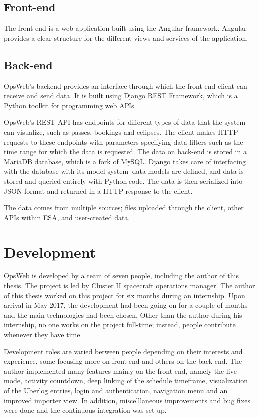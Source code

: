 \subsection{Front-end}
The front-end is a web application built using the Angular framework. \cite{angular} Angular provides a clear structure for the different views and services of the application.
\cite{d3js}
\subsection{Back-end}
OpsWeb's backend provides an interface through which the front-end client can receive and send data. It is built using Django REST Framework, which is a Python toolkit for programming web APIs. \cite{django} 

OpsWeb's REST API has endpoints for different types of data that the system can visualize, such as passes, bookings and eclipses. The client makes HTTP requests to these endpoints with parameters specifying data filters such as the time range for which the data is requested. The data on back-end is stored in a MariaDB database, which is a fork of MySQL. \cite{mariadb} Django takes care of interfacing with the database with its model system; data models are defined, and data is stored and queried entirely with Python code. The data is then serialized into JSON format and returned in a HTTP response to the client.

The data comes from multiple sources; files uploaded through the client, other APIs within ESA, and user-created data.

\section{Development}
OpsWeb is developed by a team of seven people, including the author of this thesis. The project is led by Cluster II spacecraft operations manager. The author of this thesis worked on this project for six months during an internship. Upon arrival in May 2017, the development had been going on for a couple of months and the main technologies had been chosen. Other than the author during his internship, no one works on the project full-time; instead, people contribute whenever they have time.

Development roles are varied between people depending on their interests and experience, some focusing more on front-end and others on the back-end. The author implemented many features mainly on the front-end, namely the live mode, activity countdown, deep linking of the schedule timeframe, visualization of the Uberlog entries, login and authentication, navigation menu and an improved importer view. In addition, miscelllaneous improvements and bug fixes were done and the continuous integration was set up.

